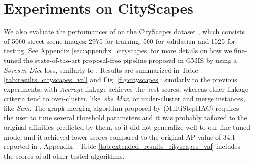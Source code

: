 \section{Experiments on CityScapes}\label{sec:cityscapes_exp}
We also evaluate the performances of \algname{} on the CityScapes dataset \cite{cordts2016cityscapes}, which consists of 5000 street-scene images: 2975 for training, 500 for validation and 1525 for testing.
See Appendix \ref{sec:appendix_cityscapes} for more details on how we fine-tuned the state-of-the-art proposal-free pipeline proposed in GMIS \cite{liu2018affinity} by using a \emph{S\o resen-Dice} loss, similarly to \cite{wolf2018mutex}.
Results are summarized in Table \ref{tab:results_cityscapes_val} and Fig. \ref{fig:cityscapes}: similarly to the previous experiments, \algname{} with \emph{Average} linkage achieves the best scores, whereas other linkage criteria tend to over-cluster, like \emph{Abs Max}, or under-cluster and merge instances, like \emph{Sum}. The graph-merging algorithm proposed by \cite{liu2018affinity} (MultiStepHAC) requires the user to tune several threshold parameters and it was probably tailored to the original affinities predicted by them, so it did not generalize well to our fine-tuned model and it achieved lower scores compared to the original AP value of 34.1 reported in \cite{liu2018affinity}.  
Appendix - Table \ref{tab:extended_results_cityscapes_val} includes the scores of all other tested \algname{} algorithms.
